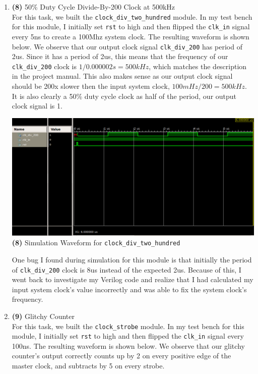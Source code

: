 \documentclass{article}
\begin{document}
\begin{enumerate}
    \item \textbf{(8)} 50\% Duty Cycle Divide-By-200 Clock at 500kHz  \\
    For this task, we built the \texttt{clock\_div\_two\_hundred} module. In my test bench for this module, I initially set \texttt{rst} to high and then flipped the \texttt{clk\_in} signal every 5ns to create a 100Mhz system clock. The resulting waveform is shown below. We observe that our output clock signal \texttt{clk\_div\_200} has period of 2us. Since it has a period of 2us, this means that the frequency of our \texttt{clk\_div\_200} clock is $1/0.000002s = 500kHz$, which matches the description in the project manual. This also makes sense as our output clock signal should be 200x slower then the input system clock, $100mHz/200 = 500kHz$. It is also clearly a 50\% duty cycle clock as half of the period, our output clock signal is 1. 
    \begin{center}
        \includegraphics[scale=0.4]{waveform-8.png} \\
        \caption{\textbf{(8)} Simulation Waveform for \texttt{clock\_div\_two\_hundred}}
    \end{center}
    One bug I found during simulation for this module is that initially the period of \texttt{clk\_div\_200} clock is 8us instead of the expected 2us. Because of this, I went back to investigate my Verilog code and realize that I had calculated my input system clock's value incorrectly and was able to fix the system clock's frequency. 
    \item \textbf{(9)} Glitchy Counter \\
    For this task, we built the \texttt{clock\_strobe} module. In my test bench for this module, I initially set \texttt{rst} to high and then flipped the \texttt{clk\_in} signal every 100ns. The resulting waveform is shown below. We observe that our glitchy counter's output correctly counts up by 2 on every positive edge of the master clock, and subtracts by 5 on every strobe. 

\end{enumerate}
\end{document}
